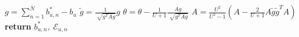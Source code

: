 \begin{algorithm}[t]
    \EndFor 
    \vspace{0.1cm}
    \State $g = \sum_{n = 1}^{\bar{N}}  b_{u,n}^* - b_u$
    \vspace{0.1cm}
	\State $\tilde{g} = \frac{1}{\sqrt[]{g^TAg}}g$
    \vspace{0.1cm}
    \State $\theta = \theta - \frac{1}{U+1}\frac{Ag}{\sqrt[]{g^TAg}}$
    \vspace{0.1cm}
    \State $A = \frac{U^2}{U^2-1}(A - \frac{2}{U+1} A \tilde{g}\tilde{g}^T A)$
\ENDWHILE
\vspace{0.1cm}
\State \textbf{return} $b_{u,n}^*, \: \mathcal{E}_{u,n}$
\end{algorithm}
